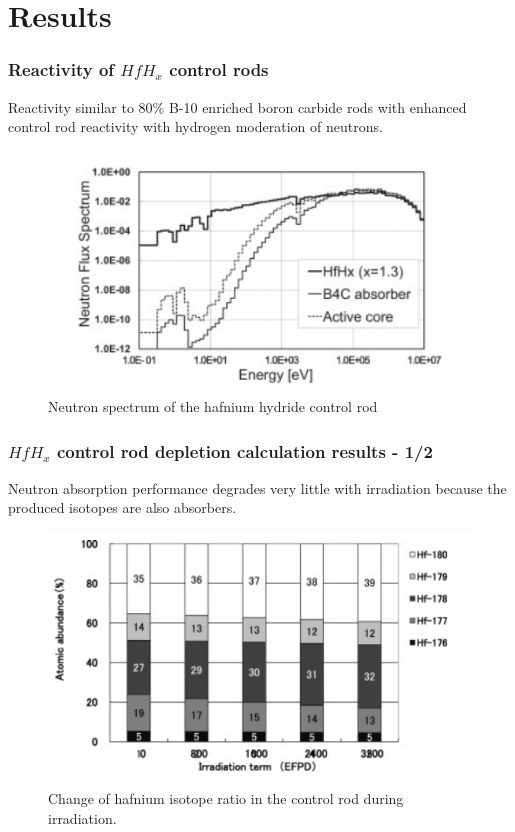 \documentclass[9pt]{beamer}
\newcommand{\hfh}{$HfH_{x}$\xspace}
\begin{document}
\section{Results}



\begin{frame}
\frametitle{Reactivity of \hfh control rods}
Reactivity similar to 80\% B-10 enriched boron carbide rods with
enhanced control rod reactivity with hydrogen moderation of neutrons.
\begin{figure}[htbp!]
  \begin{center}
      \includegraphics[scale=0.5]{./images/spectrum.png}
  \end{center}
  \caption{Neutron spectrum of the hafnium hydride control rod}
  \label{fig:spec}
\end{figure}
\end{frame}

\begin{frame}
\frametitle{\hfh control rod depletion calculation results - 1/2}
Neutron absorption performance degrades very little with irradiation
because the produced isotopes are also absorbers.
\begin{figure}[htbp!]
  \begin{center}
      \includegraphics[scale=0.48]{./images/irrad_isotope.png}
  \end{center}
  \caption{Change of hafnium isotope ratio in the control rod during irradiation.}
  \label{fig:irrad_iso}
\end{figure}
\end{frame}
\end{document}
